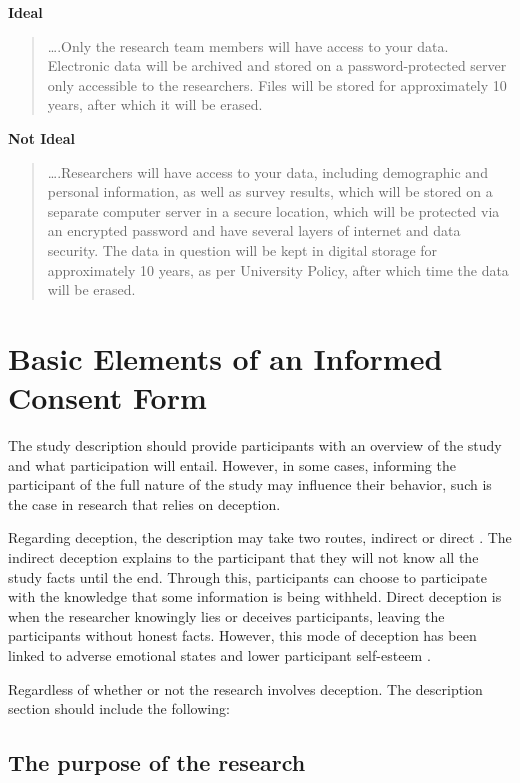 \documentclass[
  11pt,
]{book}
\begin{document}
\textbf{Ideal}

\begin{quote}
\ldots.Only the research team members will have access to your data. Electronic data will be archived and stored on a password-protected server only accessible to the researchers. Files will be stored for approximately 10 years, after which it will be erased.
\end{quote}

\textbf{Not Ideal}

\begin{quote}
\ldots.Researchers will have access to your data, including demographic and personal information, as well as survey results, which will be stored on a separate computer server in a secure location, which will be protected via an encrypted password and have several layers of internet and data security. The data in question will be kept in digital storage for approximately 10 years, as per University Policy, after which time the data will be erased.
\end{quote}

\section{Basic Elements of an Informed Consent Form}\label{basic-elements-of-an-informed-consent-form}

The study description should provide participants with an overview of the study and what participation will entail. However, in some cases, informing the participant of the full nature of the study may influence their behavior, such is the case in research that relies on deception.

Regarding deception, the description may take two routes, indirect or direct \citep{boynton_exploring_2013}. The indirect deception explains to the participant that they will not know all the study facts until the end. Through this, participants can choose to participate with the knowledge that some information is being withheld. Direct deception is when the researcher knowingly lies or deceives participants, leaving the participants without honest facts. However, this mode of deception has been linked to adverse emotional states and lower participant self-esteem \citep{boynton_exploring_2013}.

Regardless of whether or not the research involves deception. The description section should include the following:

\subsection{The purpose of the research}\label{the-purpose-of-the-research}
\end{document}

